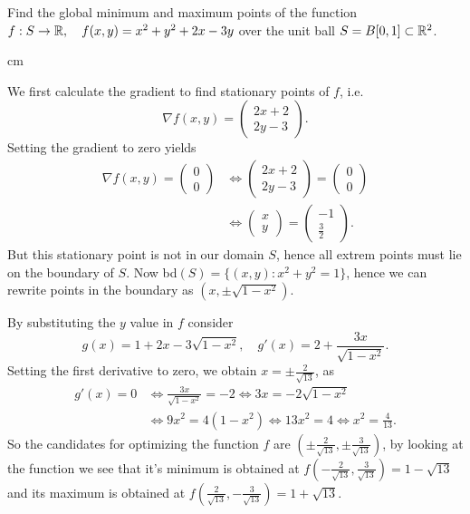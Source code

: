 \documentclass{ExerciseSheet}
\newif\ifsolutions
\begin{document}
\vskip 0.5cm 

\begin{problem}
    Find the global minimum and maximum points of the function $f:S \rightarrow \mathbb{R}, \quad  f(x,y)=x^2+y^2+2x-3y$ over the unit ball $S=B[0,1]\subset \mathbb{R}^2$.
\end{problem}

\ifsolutions
{} cm
\begin{solution}
    We first calculate the gradient to find stationary points of $f$, i.e.
    \begin{equation*}
        \nabla f(x,y)=\left(\begin{array}{c} 2x+2 \\ 2y-3 \end{array}\right).
    \end{equation*}
Setting the gradient to zero yields
\begin{align*}
    \nabla f(x,y)=\left(\begin{array}{c} 0\\ 0 \end{array}\right) &\iff \left(\begin{array}{c} 2x+2 \\ 2y-3 \end{array}\right) = \left(\begin{array}{c} 0\\ 0 \end{array}\right) \\
    &\iff \left(\begin{array}{c} x\\ y \end{array}\right) = \left(\begin{array}{c} -1 \\ \frac{3}{2} \end{array}\right).
\end{align*}
But this stationary point is not in our domain $S$, hence all extrem points must lie on the boundary of $S$. Now bd$(S)=\{(x,y): x^2+y^2=1\}$, hence we can rewrite points in the boundary as $(x, \pm \sqrt{1-x^2})$.

By substituting the $y$ value in $f$ consider
\begin{equation*}  
    g(x)=1+2x-3\sqrt{1-x^2}, \quad g'(x)= 2 + \frac{3x}{\sqrt{1-x^2}}.
\end{equation*}
Setting the first derivative to zero, we obtain $x=\pm \frac{2}{\sqrt{13}}$, as
\begin{align*}
    g'(x)=0 &\iff \frac{3x}{\sqrt{1-x^2}} = -2 \iff 3x = -2\sqrt{1-x^2} \\
    &\iff 9x^2 = 4(1-x^2) \iff 13x^2 = 4 \iff x^2 = \frac{4}{13}.
\end{align*}
So the candidates for optimizing the function $f$ are $(\pm \frac{2}{\sqrt{13}}, \pm \frac{3}{\sqrt{13}})$, by looking at the function we see that it's minimum is obtained at $f(-\frac{2}{\sqrt{13}}, \frac{3}{\sqrt{13}})= 1 - \sqrt{13}$ and its maximum is obtained at  $f(\frac{2}{\sqrt{13}}, -\frac{3}{\sqrt{13}})= 1 + \sqrt{13}$.
\end{solution}
\end{document}
